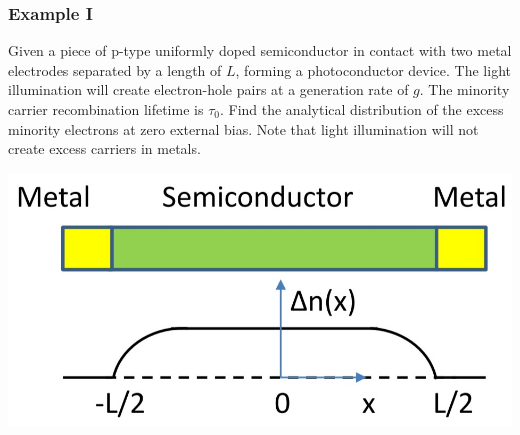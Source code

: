 \documentclass{beamer}
\begin{document}
    \begin{frame} \frametitle{Example I}
        \par Given a piece of p-type uniformly doped semiconductor in contact with two metal electrodes separated by a length of $L$, forming a photoconductor device. The light illumination will create electron-hole pairs at a generation rate of $g$. The minority carrier recombination lifetime is $\tau_0$. Find the analytical distribution of the excess minority electrons at zero external bias. Note that light illumination will not create excess carriers in metals. \\[3em]
        \begin{minipage}{\linewidth}
            \begin{minipage}{0.3\linewidth}
                \includegraphics[width=\linewidth]{Example-1.jpg}
            \end{minipage}
            \begin{minipage}{0.69\linewidth}
            \end{minipage}
        \end{minipage}
    \end{frame}
\end{document}
